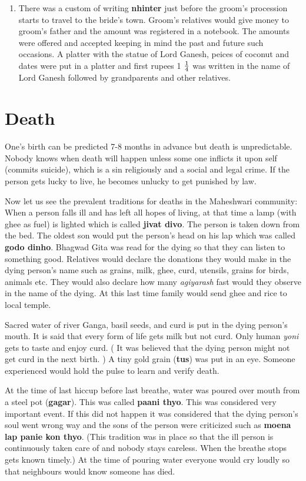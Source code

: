 \begin{enumerate}
\item There was a custom of writing \textbf{nhinter} just before the groom's
procession starts to travel to the bride's town. Groom's relatives would give
money to groom's father and the amount was registered in a notebook. The
amounts were offered and accepted keeping in mind the past and future such
occasions. A platter with the statue of Lord Ganesh, peices of coconut and
dates were put in a platter and first rupees 1 $1\over4$ was written in the
name of Lord Ganesh followed by grandparents and other relatives.

\end{enumerate}

\section{Death} 
One's birth can be predicted 7-8 months in advance but death is unpredictable.
Nobody knows when death will happen unless some one inflicts it upon self
(commits suicide), which is a sin religiously and a social and legal crime. If
the person gets lucky to live, he becomes unlucky to get punished by law.

Now let us see the prevalent traditions for deaths in the Maheshwari community:
When a person falls ill and has left all hopes of living, at that time a lamp
(with ghee as fuel) is lighted which is called \textbf{jivat divo}. The person
is taken down from the bed. The oldest son would put the person's head on his
lap which was called \textbf{godo dinho}. Bhagwad Gita was read for the dying so
that they can listen to something good. Relatives would declare the donations
they would make in the dying person's name such as grains, milk, ghee, curd,
utensils, grains for birds, animals etc. They would also declare how many
\textit{agiyarash} fast would they observe in the name of the dying. At this
last time family would send ghee and rice to local temple.

Sacred water of river Ganga, basil seeds, and curd is put in the dying person's
mouth. It is said that every form of life gets milk but not curd. Only human
\textit{yoni} gets to taste and enjoy curd. ( It was believed that the dying
person might not get curd in the next birth. ) A tiny gold grain (\textbf{tus})
was put in an eye. Someone experienced would hold the pulse to learn and verify
death.

At the time of last hiccup before last breathe, water was poured over mouth
from a steel pot (\textbf{gagar}). This was called \textbf{paani thyo}. This
was considered very important event. If  this did not happen it was considered
that the dying person's soul went wrong way and the sons of the person were
criticized such as \textbf{moena lap panie kon thyo}. (This tradition was in
place so that the ill person is continuously taken care of and nobody stays
careless. When the breathe stops gets known timely.) At the time of pouring
water everyone would cry loudly so that neighbours would know someone has died.

